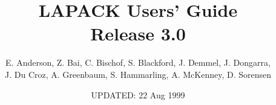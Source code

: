 \providecommand{\dent}{\hspace*{0.24in}}\providecommand{\nh}[1]{\hyphenation{#1}}

\makeindex

\title{LAPACK Users' Guide \\
       Release 3.0}
\author{E. Anderson, Z. Bai, C. Bischof, S. Blackford, J. Demmel, J. Dongarra,\\
J. Du Croz, A. Greenbaum, S. Hammarling, A. McKenney, D. Sorensen
} 
\date{UPDATED: 22 Aug 1999}





\makeatletter

